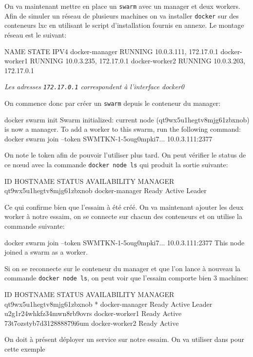 On va maintenant mettre en place un \verb:swarm: avec un manager et deux workers. Afin de
simuler un réseau de plusieurs machines on va installer \verb:docker: sur des conteneurs
lxc en utilisant le script d'installation fournis en annexe. Le montage réseau est le suivant:
\begin{bash}
NAME           STATE            IPV4        
docker-manager RUNNING 10.0.3.111, 172.17.0.1
docker-worker1 RUNNING 10.0.3.235, 172.17.0.1
docker-worker2 RUNNING 10.0.3.203, 172.17.0.1
\end{bash} 
\begin{center}
    \emph{Les adresses \verb:172.17.0.1: correspondent à l'interface docker0}
\end{center}
On commence donc par créer un \verb:swarm: depuis le conteneur du manager:
\begin{bash}
docker swarm init
Swarm initialized: current node (qt9wx5u1hegtv8mjg61zbxnob) is now a manager.
To add a worker to this swarm, run the following command:
    docker swarm join --token SWMTKN-1-5oug0mpki7... 10.0.3.111:2377
\end{bash}
On note le token afin de pouvoir l'utiliser plus tard. On peut vérifier le status de 
ce nœud avec la commande \verb:docker node ls: qui produit la sortie suivante:
\begin{bash}
ID                        HOSTNAME         STATUS    AVAILABILITY   MANAGER
qt9wx5u1hegtv8mjg61zbxnob docker-manager   Ready     Active         Leader
\end{bash}
Ce qui confirme bien que l'essaim à été créé. On va maintenant ajouter les deux worker à notre 
essaim, on se connecte sur chacun des conteneurs et on utilise la commande suivante:
\begin{bash}
docker swarm join --token SWMTKN-1-5oug0mpki7... 10.0.3.111:2377
This node joined a swarm as a worker.
\end{bash}
Si on se reconnecte sur le conteneur du manager et que l'on lance à nouveau la commande
\verb:docker node ls:, on peut voir que l'essaim comporte bien 3 machines:
\begin{bash}
ID                          HOSTNAME         STATUS    AVAILABILITY   MANAGER
qt9wx5u1hegtv8mjg61zbxnob * docker-manager   Ready     Active         Leader 
u2g1r24whkfz34mwn8rb9ovrs   docker-worker1   Ready     Active                
73t7ozstyb7d312888879i6um   docker-worker2   Ready     Active                
\end{bash}
On doit à présent déployer un service sur notre essaim. On va utiliser dans pour cette exemple
